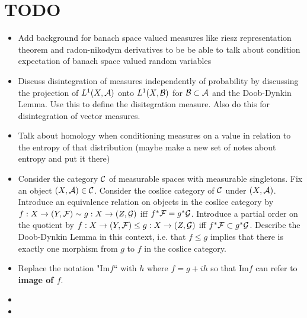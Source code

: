 \documentclass{book}
\begin{document}
	\chapter{TODO}
	\begin{itemize}
		\item Add background for banach space valued measures like riesz representation theorem and radon-nikodym derivatives to be be able to talk about condition expectation of banach space valued random variables
		\item Discuss disintegration of measures independently of probability by discussing the projection of $L^1(X, \mathcal{A})$ onto $L^1(X, \mathcal{B})$ for $\mathcal{B} \subset \mathcal{A}$ and the Doob-Dynkin Lemma. Use this to define the disitegration measure. Also do this for disintegration of vector measures.
		\item Talk about homology when conditioning measures on a value in relation to the entropy of that distribution (maybe make a new set of notes about entropy and put it there)
		\item Consider the category $\mathcal{C}$ of measurable spaces with measurable singletons. Fix an object $(X, \mathcal{A}) \in \mathcal{C}$. Consider the coslice category of $\mathcal{C}$ under $(X, \mathcal{A})$. Introduce an equivalence relation on objects in the coslice category by $f:X \rightarrow (Y, \mathcal{F}) \sim g: X \rightarrow (Z, \mathcal{G})$ iff $f^*\mathcal{F} = g^*\mathcal{G}$. Introduce a partial order on the quotient by $f:X \rightarrow (Y, \mathcal{F}) \leq g: X \rightarrow (Z, \mathcal{G})$ iff $f^*\mathcal{F} \subset g^*\mathcal{G}$.  Describe the Doob-Dynkin Lemma in this context, i.e. that $f \leq g$ implies that there is exactly one morphism from $g$ to $f$ in the coslice category.
		\item  Replace the notation "$\text{Im} f$`` with $h$ where $f = g + ih$ so that $\text{Im}f$ can refer to \textbf{image of $f$}.
		\item {} 
		\item {}
	\end{itemize}






	
	
	
	
	
	
\end{document}
